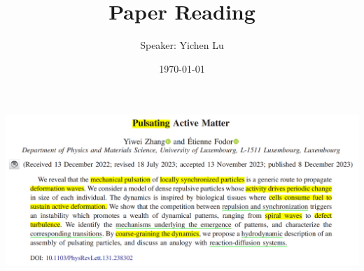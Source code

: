 \documentclass[10pt,aspectratio=43,mathserif,table]{beamer}
\title{Paper Reading}
\author{Speaker: Yichen Lu\quad \newline  \newline \quad }
\institute{\fontsize{8pt}{14pt}}
\date{\today}
\begin{document}

\begin{frame}
    \centering
        \includegraphics[width=\textwidth]{title.png}
\end{frame}
\end{document}
